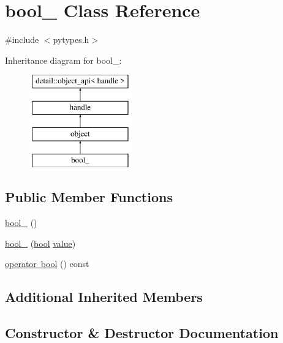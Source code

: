 \hypertarget{classbool__}{}\section{bool\+\_\+ Class Reference}
\label{classbool__}


{\ttfamily \#include $<$pytypes.\+h$>$}

Inheritance diagram for bool\+\_\+\+:\begin{figure}[H]
\begin{center}
\leavevmode
\includegraphics[height=4.000000cm]{classbool__}
\end{center}
\end{figure}
\subsection*{Public Member Functions}
\begin{DoxyCompactItemize}
\item 
\mbox{\hyperlink{classbool___a534f65c6adbb680ce58cb97abf7f478d}{bool\+\_\+}} ()
\item 
\mbox{\hyperlink{classbool___a9a6df8a2673d2c7652afc7ffd284d947}{bool\+\_\+}} (\mbox{\hyperlink{asdl_8h_af6a258d8f3ee5206d682d799316314b1}{bool}} \mbox{\hyperlink{_s_d_l__opengl__glext_8h_a8ad81492d410ff2ac11f754f4042150f}{value}})
\item 
\mbox{\hyperlink{classbool___a0a11b757daab484712417847ea09ff26}{operator bool}} () const
\end{DoxyCompactItemize}
\subsection*{Additional Inherited Members}


\subsection{Constructor \& Destructor Documentation}
\mbox{\label{classbool___a534f65c6adbb680ce58cb97abf7f478d}} 
